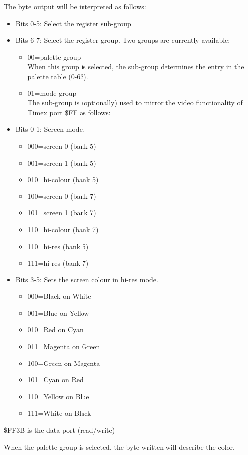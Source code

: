 The byte output will be interpreted as follows:
\begin{itemize}
\item[] Bits 0-5: Select the register sub-group
\item[] Bits 6-7: Select the register group. Two groups are currently available:
  \begin{itemize}
  \item[] 00=palette group\\
    When this group is selected, the sub-group determines the entry in the
    palette table (0-63).
  \item[] 01=mode group\\
    The sub-group is (optionally) used to mirror the video functionality
    of Timex port \$FF as follows:
  \end{itemize}
\item[] Bits 0-1: Screen mode.
  \begin{itemize}
  \item[] 000=screen 0 (bank 5)
  \item[] 001=screen 1 (bank 5)
  \item[] 010=hi-colour (bank 5)
  \item[] 100=screen 0 (bank 7)
  \item[] 101=screen 1 (bank 7)
  \item[] 110=hi-colour (bank 7)
  \item[] 110=hi-res (bank 5)
  \item[] 111=hi-res (bank 7)
  \end{itemize}
\item[] Bits 3-5: Sets the screen colour in hi-res mode.
  \begin{itemize}
  \item[] 000=Black on White
  \item[] 001=Blue on Yellow
  \item[] 010=Red on Cyan
  \item[] 011=Magenta on Green
  \item[] 100=Green on Magenta
  \item[] 101=Cyan on Red
  \item[] 110=Yellow on Blue
  \item[] 111=White on Black
  \end{itemize}
\end{itemize}

\$FF3B is the data port (read/write)

When the palette group is selected, the byte written will describe the
color.


